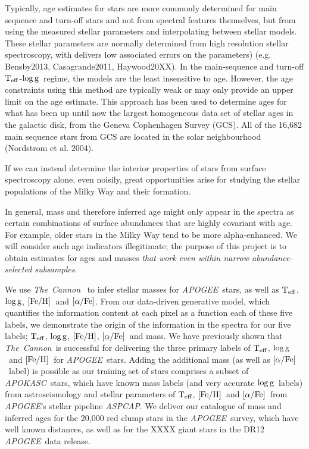 \documentclass[12pt, preprint]{aastex}
\newcommand{\project}[1]{\textsl{#1}}
\newcommand{\tc}{\project{The~Cannon}}
\newcommand{\apogee}{\project{APOGEE}}
\newcommand{\apokasc}{\project{APOKASC}}
\newcommand{\aspcap}{\project{ASPCAP}}
\newcommand{\teff}{\mbox{$\rm T_{eff}$}}
\newcommand{\feh}{\mbox{$\rm [Fe/H]$}}
\newcommand{\alphafe}{\mbox{$\rm [\alpha/Fe]$}}
\newcommand{\logg}{\mbox{$\rm \log g$}}
\begin{document}
Typically, age estimates for stars are more commonly determined for main sequence and turn-off stars and not from spectral features themselves, but from using the measured stellar parameters and interpolating between stellar models. These stellar parameters are normally determined from high resolution stellar spectroscopy, with delivers low associated errors on the parameters) (e.g. Bensby2013, Casagrande2011, Haywood20XX). In the main-sequence and turn-off \teff-\logg\ regime, the models are the least insensitive to age.  However, the age constraints using this method are typically weak or may only provide an upper limit on the age estimate.  This approach has been used to determine ages for what has been up until now the largest homogeneous data set of stellar ages in the galactic disk, from the Geneva Cophenhagen Survey (GCS). All of the 16,682 main sequence stars from GCS are located in the solar neighbourhood (Nordstrom et al. 2004).

If we can instead determine the interior properties of stars from surface
spectroscopy alone, even noisily, great opportunities arise for
studying the stellar populations of the Milky Way and their formation. 

In general, mass and therefore inferred age might only appear in the spectra as
certain combinations of surface abundances that are highly covariant
with age.  For example, older stars in the Milky Way tend to be more
alpha-enhanced.  We will consider such age indicators illegitimate;
the purpose of this project is to obtain estimates for ages and masses \emph{that work even within narrow abundance-selected subsamples}.


We use \tc\  \citep{Ness2015} to infer stellar masses for \apogee\ stars, as well as \teff, \logg, \feh\ and \alphafe.  From our data-driven generative model, which quantifies the information content at each pixel as a function each of these five labels, we demonstrate the origin of the information in the spectra for our five labels; \teff, \logg, \feh, \alphafe\ and mass. We have previously shown that \tc\ is successful for delivering the three primary labels of \teff, \logg\ and \feh\ for \apogee\ stars. Adding the additional mass (as well as \alphafe\ label) is possible as our training set of stars comprises a subset of \apokasc\ stars, which have known mass labels (and very accurate \logg\ labels) from astroseismology and stellar parameters of \teff, \feh\ and \alphafe\ from \apogee's stellar pipeline \aspcap. We deliver our catalogue of mass and inferred ages for the 20,000 red clump stars in the \apogee\ survey, which have well known distances, as well as for the XXXX giant stars in the DR12 \apogee\ data release.
\end{document}
